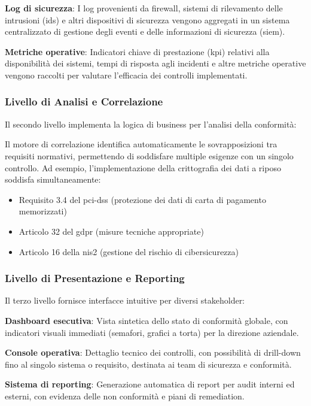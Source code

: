 \textbf{Log di sicurezza}: I log provenienti da firewall, sistemi di rilevamento delle intrusioni (\gls{ids}) e altri dispositivi di sicurezza vengono aggregati in un sistema centralizzato di gestione degli eventi e delle informazioni di sicurezza (\gls{siem}).

\textbf{Metriche operative}: Indicatori chiave di prestazione (\gls{kpi}) relativi alla disponibilità dei sistemi, tempi di risposta agli incidenti e altre metriche operative vengono raccolti per valutare l'efficacia dei controlli implementati.

\subsubsection{Livello di Analisi e Correlazione}

Il secondo livello implementa la logica di business per l'analisi della conformità:

Il motore di correlazione identifica automaticamente le sovrapposizioni tra requisiti normativi, permettendo di soddisfare multiple esigenze con un singolo controllo. Ad esempio, l'implementazione della crittografia dei dati a riposo soddisfa simultaneamente:
\begin{itemize}
    \item Requisito 3.4 del \gls{pci-dss} (protezione dei dati di carta di pagamento memorizzati)
    \item Articolo 32 del \gls{gdpr} (misure tecniche appropriate)
    \item Articolo 16 della \gls{nis2} (gestione del rischio di cibersicurezza)
\end{itemize}

\subsubsection{Livello di Presentazione e Reporting}

Il terzo livello fornisce interfacce intuitive per diversi stakeholder:

\textbf{Dashboard esecutiva}: Vista sintetica dello stato di conformità globale, con indicatori visuali immediati (semafori, grafici a torta) per la direzione aziendale.

\textbf{Console operativa}: Dettaglio tecnico dei controlli, con possibilità di drill-down fino al singolo sistema o requisito, destinata ai team di sicurezza e conformità.

\textbf{Sistema di reporting}: Generazione automatica di report per audit interni ed esterni, con evidenza delle non conformità e piani di remediation.

